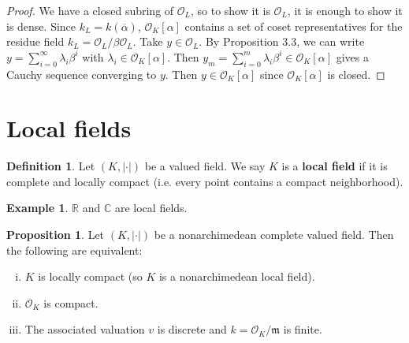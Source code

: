 \documentclass{article}
\theoremstyle{definition}
\newtheorem{prop}[theorem]{Proposition}
\newtheorem{example}{Example}[section]
\newtheorem{defn}{Definition}[section]
\begin{document}
\begin{proof}
    We have a closed subring of $\mathcal{O}_L$, so to show it is $\mathcal{O}_L$, it is enough to show it is dense. Since $k_L = k(\overline{\alpha})$, $\mathcal{O}_K[\alpha]$ contains a set of coset representatives for the residue field $k_L = \mathcal{O}_L/\beta \mathcal{O}_L$. Take $y \in \mathcal{O}_L$. By Proposition 3.3, we can write $y = \sum_{i=0}^{\infty} \lambda_i \beta^i$ with $\lambda_i \in \mathcal{O}_K[\alpha]$. Then $y_m = \sum_{i=0}^{m} \lambda_i \beta^i \in \mathcal{O}_K[\alpha]$ gives a Cauchy sequence converging to $y$. Then $y \in \mathcal{O}_K[\alpha]$ since $\mathcal{O}_K[\alpha]$ is closed.
\end{proof}
\section{Local fields}
\begin{defn}
    Let $(K,|\cdot|)$ be a valued field. We say $K$ is a \textbf{local field} if it is complete and locally compact (i.e. every point contains a compact neighborhood).
\end{defn}
\begin{example}
    $\mathbb{R}$ and $\mathbb{C}$ are local fields.
\end{example}
\begin{prop}
    Let $(K,|\cdot|)$ be a nonarchimedean complete valued field. Then the following are equivalent:
    \begin{enumerate}[(i)]
        \item $K$ is locally compact (so $K$ is a nonarchimedean local field).
        \item $\mathcal{O}_K$ is compact.
        \item The associated valuation $v$ is discrete and $k = \mathcal{O}_K/\mathfrak{m}$ is finite.
    \end{enumerate}
\end{prop}
\end{document}
